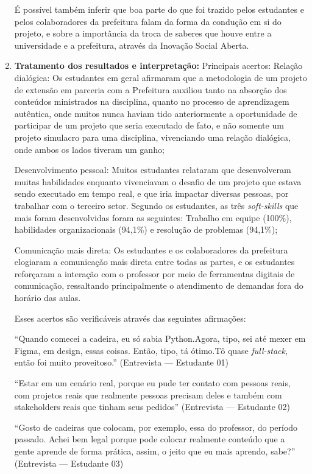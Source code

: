 \begin{enumerate}
É possível também inferir que boa parte do que foi trazido pelos estudantes e pelos colaboradores da prefeitura falam da forma da condução em si do projeto, e sobre a importância da troca de saberes que houve entre a universidade e a prefeitura, através da Inovação Social Aberta.

    \item \textbf{Tratamento dos resultados e interpretação: }
Principais acertos:
Relação dialógica: Os estudantes em geral afirmaram que a metodologia de um projeto de extensão em parceria com a Prefeitura auxiliou tanto na absorção dos conteúdos ministrados na disciplina, quanto no processo de aprendizagem autêntica, onde muitos nunca haviam tido anteriormente a oportunidade de participar de um projeto que seria executado de fato, e não somente um projeto simulacro para uma disciplina, vivenciando uma relação dialógica, onde ambos os lados tiveram um ganho;

Desenvolvimento pessoal: Muitos estudantes relataram que desenvolveram muitas habilidades enquanto vivenciavam o desafio de um projeto que estava sendo executado em tempo real, e que iria impactar diversas pessoas, por trabalhar com o terceiro setor. Segundo os estudantes, as três \textit{soft-skills} que mais foram desenvolvidas foram as seguintes: Trabalho em equipe (100\%), habilidades organizacionais (94,1\%) e resolução de problemas (94,1\%);

Comunicação mais direta: Os estudantes e os colaboradores da prefeitura elogiaram a comunicação mais direta entre todas as partes, e os estudantes reforçaram a interação com o professor por meio de ferramentas digitais de comunicação, ressaltando principalmente o atendimento de demandas fora do horário das aulas.

Esses acertos são verificáveis através das seguintes afirmações:

“Quando comecei a cadeira, eu só sabia Python.Agora, tipo, sei até mexer em Figma, em design, essas coisas. Então, tipo, tá ótimo.Tô quase \textit{full-stack}, então foi muito proveitoso.”
(Entrevista — Estudante 01)

“Estar em um cenário real, porque eu pude ter contato com pessoas reais, com projetos reais que realmente pessoas precisam deles e também com stakeholders reais que tinham seus pedidos”
(Entrevista — Estudante 02)

“Gosto de cadeiras que colocam, por exemplo, essa do professor, do período passado. Achei bem legal porque pode colocar realmente conteúdo que a gente aprende de forma prática, assim, o jeito que eu mais aprendo, sabe?”
(Entrevista — Estudante 03)


\end{enumerate}
